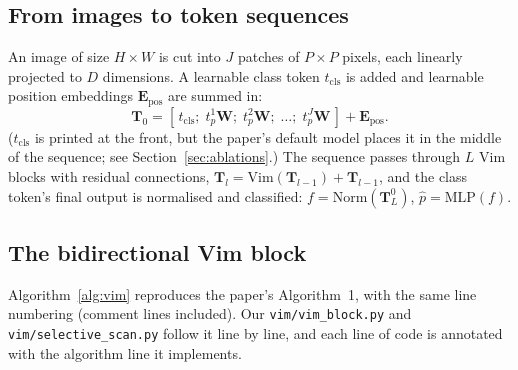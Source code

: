 \documentclass[11pt,a4paper]{article}
\begin{document}
\subsection{From images to token sequences}
An image of size $H\times W$ is cut into $J$ patches of $P\times P$ pixels, each
linearly projected to $D$ dimensions. A learnable class token $t_{\mathrm{cls}}$ is
added and learnable position embeddings $\mathbf{E}_{\mathrm{pos}}$ are summed in:
\begin{equation}
  \mathbf{T}_0 = [\,t_{\mathrm{cls}};\; t_p^1\mathbf{W};\; t_p^2\mathbf{W};\;\dots;\;
                 t_p^J\mathbf{W}\,] + \mathbf{E}_{\mathrm{pos}} .
  \label{eq:tokens}
\end{equation}
($t_{\mathrm{cls}}$ is printed at the front, but the paper's default model places it
in the middle of the sequence; see Section~\ref{sec:ablations}.) The sequence passes
through $L$ Vim blocks with residual connections,
$\mathbf{T}_l = \mathrm{Vim}(\mathbf{T}_{l-1}) + \mathbf{T}_{l-1}$, and the class
token's final output is normalised and classified:
$f = \mathrm{Norm}(\mathbf{T}_L^0)$, $\hat p = \mathrm{MLP}(f)$.

\subsection{The bidirectional Vim block}
Algorithm~\ref{alg:vim} reproduces the paper's Algorithm~1, with the same line
numbering (comment lines included). Our \texttt{vim/vim\_block.py} and
\texttt{vim/selective\_scan.py} follow it line by line, and each line of code is
annotated with the algorithm line it implements.
\end{document}
